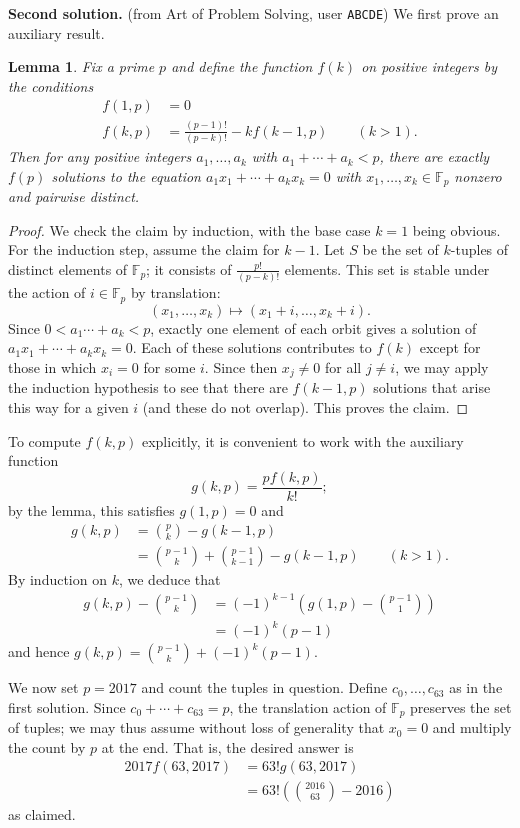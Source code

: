 \documentclass[amssymb,twocolumn,pra,10pt,aps]{revtex4-1}
\newtheorem*{lemma*}{Lemma}
\begin{document}
\begin{itemize}
\noindent
\textbf{Second solution.}
(from Art of Problem Solving, user \texttt{ABCDE})
We first prove an auxiliary result. 
\begin{lemma*}
Fix a prime $p$ and define the function $f(k)$ on positive integers by the conditions
\begin{align*}
f(1,p) &= 0 \\
f(k,p) &= \frac{(p-1)!}{(p-k)!} - kf(k-1,p) \qquad (k>1).
\end{align*}
Then for any positive integers $a_1,\dots,a_k$ with
$a_1 + \cdots + a_k < p$, there are exactly $f(p)$ solutions to the equation $a_1 x_1 + \cdots + a_k x_k = 0$
with $x_1,\dots,x_k \in \mathbb{F}_p$ nonzero and pairwise distinct.
\end{lemma*}
\begin{proof}
We check the claim by induction, with the base case $k=1$ being obvious.
For the induction step, assume the claim for $k-1$.
Let $S$ be the set of $k$-tuples of distinct elements of $\mathbb{F}_p$;
it consists of $\frac{p!}{(p-k)!}$ elements.
This set is stable under the action of $i \in \mathbb{F}_p$ by translation:
\[
(x_1,\dots,x_k) \mapsto (x_1 + i, \dots, x_k + i).
\]
Since $0 < a_1 \cdots + a_k < p$, exactly one element of each orbit gives a solution of
$a_1 x_1 + \cdots + a_k x_k = 0$. Each of these solutions contributes to $f(k)$ except
for those in which $x_i = 0$ for some $i$.
Since then $x_j \neq 0$ for all $j \neq i$, we may apply the induction hypothesis to see that there are
$f(k-1,p)$ solutions that arise this way for a given $i$ (and these do not overlap).
This proves the claim.
\end{proof}

To compute $f(k,p)$ explicitly, it is convenient to work with the auxiliary function
\[
g(k,p) = \frac{p f(k,p)}{k!};
\]
by the lemma, this satisfies $g(1,p) = 0$ and 
\begin{align*}
g(k,p) &= \binom{p}{k} - g(k-1,p)  \\
&= \binom{p-1}{k} + \binom{p-1}{k-1} - g(k-1, p) \qquad (k>1).
\end{align*}
By induction on $k$, we deduce that
\begin{align*}
g(k,p) - \binom{p-1}{k} &= (-1)^{k-1} \left( g(1,p) - \binom{p-1}{1} \right) \\
 &= (-1)^k (p-1)
\end{align*}
and hence
$g(k,p) = \binom{p-1}{k} + (-1)^k (p-1)$.

We now set $p=2017$ and count the tuples in question.
Define $c_0,\dots,c_{63}$ as in the first solution. Since $c_0 + \cdots + c_{63} = p$,
the translation action of $\mathbb{F}_p$ preserves the set of tuples; we may thus assume without loss of generality
that $x_0 = 0$ and multiply the count by $p$ at the end. That is, the desired answer is
\begin{align*}
2017 f(63, 2017) &= 63! g(63, 2017) \\
& = 63! \left( \binom{2016}{63} - 2016 \right)
\end{align*}
as claimed.

\end{itemize}
\end{document}
